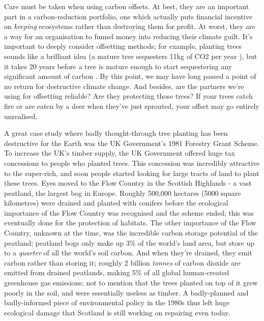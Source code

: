 \documentclass{article}
\begin{document}
Care must be taken when using carbon offsets. At best, they are an important part in a carbon-reduction portfolio, one which actually puts financial incentive on \emph{keeping} ecosystems rather than destroying them for profit. At worst, they are a way for an organisation to funnel money into reducing their climate guilt. It's important to deeply consider offsetting methods; for example, planting trees sounds like a brilliant idea (a mature tree sequesters 11kg of CO2 per year \citep{akbari2002shade}), but it takes 20 years before a tree is mature enough to start sequestering any significant amount of carbon \citep{ghussain2020biggest}. By this point, we may have long passed a point of no return for destructive climate change. And besides, are the partners we're using for offsetting reliable? Are they protecting those trees? If your trees catch fire or are eaten by a deer when they've just sprouted, your offset may go entirely unrealised. \newline

A great case study where badly thought-through tree planting has been destructive for the Earth was the UK Government's 1981 Forestry Grant Scheme. To increase the UK's timber supply, the UK Government offered huge tax concessions to people who planted trees. \citep{watkins1983public} This concession was incredibly attractive to the super-rich, and soon people started looking for large tracts of land to plant these trees. Eyes moved to the Flow Country in the Scottish Highlands - a vast peatland, the largest bog in Europe. Roughly 500,000 hectares (5000 square kilometres) were drained and planted with conifers before the ecological importance of the Flow Country was recognised and the scheme ended; this was eventually done for the protection of habitats. The other importance of the Flow Country, unknown at the time, was the incredible carbon storage potential of the peatland; peatland bogs only make up 3\% of the world's land area, but store up to a \emph{quarter} of all the world's soil carbon. \citep{turetsky2015global} And when they're drained, they emit carbon rather than storing it; roughly 2 billion \emph{tonnes} of carbon dioxide are emitted from drained peatlands, making 5\% of all global human-created greenhouse gas emissions; not to mention that the trees planted on top of it grew poorly in the soil, and were essentially useless as timber. A badly-planned and badly-informed piece of environmental policy in the 1980s thus left huge ecological damage that Scotland is still working on repairing even today. \citep{gewin2020peat} \newline
\end{document}
